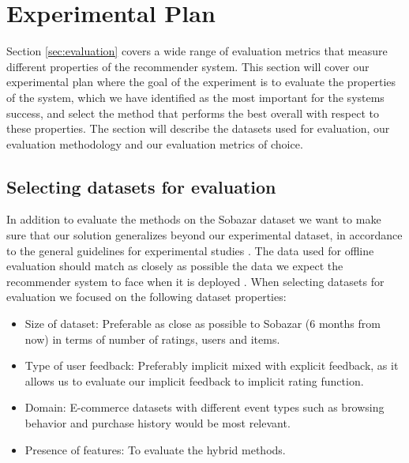 \section{Experimental Plan}


Section \ref{sec:evaluation} covers a wide range of evaluation metrics that measure different properties of the recommender system. This section will cover our experimental plan where the goal of the experiment is to evaluate the properties of the system, which we have identified as the most important for the systems success, and select the method that performs the best overall with respect to these properties. The section will describe the datasets used for evaluation, our evaluation methodology and our evaluation metrics of choice.

\subsection{Selecting datasets for evaluation}

In addition to evaluate the methods on the Sobazar dataset we want to make sure that our solution generalizes beyond our experimental dataset, in accordance to the general guidelines for experimental studies \cite{Shani2011}. The data used for offline evaluation should match as closely as possible the data we expect the recommender system to face when it is deployed \cite{Gunawardana2009}. When selecting datasets for evaluation we focused on the following dataset properties:

\begin{itemize}
\item Size of dataset: Preferable as close as possible to Sobazar (6 months from now) in terms of number of ratings, users and items.
\item Type of user feedback: Preferably implicit mixed with explicit feedback, as it allows us to evaluate our implicit feedback to implicit rating function.
\item Domain: E-commerce datasets with different event types such as browsing behavior and purchase history would be most relevant.
\item Presence of features: To evaluate the hybrid methods.
\end{itemize}

